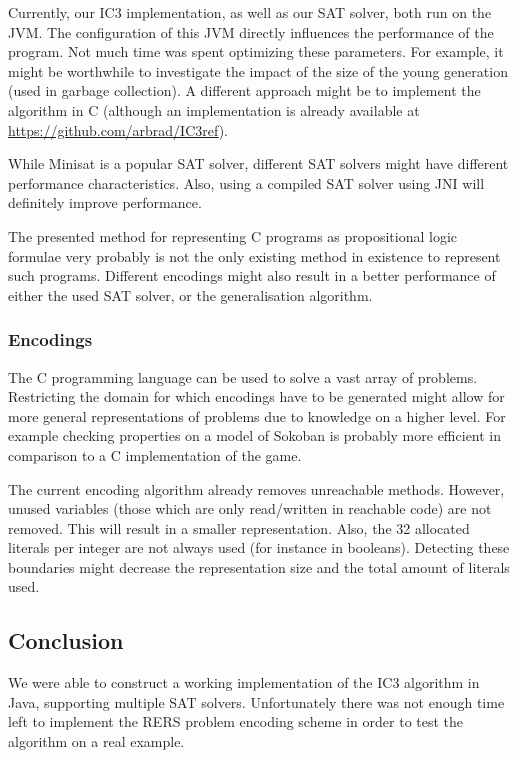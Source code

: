 \documentclass[a4paper]{article}
\begin{document}
Currently, our IC3 implementation, as well as our SAT solver, both run on the JVM. The configuration of this JVM directly influences the performance of the program. Not much time was spent optimizing these parameters. For example, it might be worthwhile to investigate the impact of the size of the young generation (used in garbage collection). A different approach might be to implement the algorithm in C (although an implementation is already available at \url{https://github.com/arbrad/IC3ref}).

While Minisat is a popular SAT solver, different SAT solvers might have different performance characteristics. Also, using a compiled SAT solver using JNI will definitely improve performance.

The presented method for representing C programs as propositional logic formulae very probably is not the only existing method in existence to represent such programs. Different encodings might also result in a better performance of either the used SAT solver, or the generalisation algorithm.

\newpage
\subsubsection{Encodings}
The C programming language can be used to solve a vast array of problems. %
Restricting the domain for which encodings have to be generated might allow for more general representations of problems due to knowledge on a higher level. For example checking properties on a model of Sokoban is probably more efficient in comparison to a C implementation of the game.

The current encoding algorithm already removes unreachable methods. However, unused variables (those which are only read/written in reachable code) are not removed. This will result in a smaller representation. Also, the 32 allocated literals per integer are not always used (for instance in booleans). Detecting these boundaries might decrease the representation size and the total amount of literals used. 

\subsection{Conclusion}
We were able to construct a working implementation of the IC3 algorithm in Java, supporting multiple SAT solvers.
Unfortunately there was not enough time left to implement the RERS problem encoding scheme in order to test the algorithm on a real example.
\end{document}
